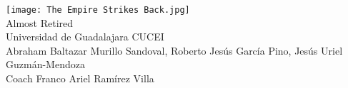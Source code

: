 \documentclass{article} %
\begin{document}
  

\pagestyle{empty}
  \begin{center}
    \strut %
    \texttt{[image: The Empire Strikes Back.jpg]} \\
    {\Huge Almost Retired\\}
    \vspace{1cm}
    {\fontsize{15}{15}\selectfont Universidad de Guadalajara CUCEI\\}
    \vspace{0.5cm}
    {\Large Abraham Baltazar Murillo Sandoval, Roberto Jesús García Pino, Jesús Uriel Guzmán-Mendoza\\}
    {\Large \hfill \break Coach Franco Ariel Ramírez Villa\\}
    \vfill
    \vspace{0.5cm}
    \vspace{1cm}
  \end{center}
\clearpage
\pagestyle{fancy}
  
\end{document}
